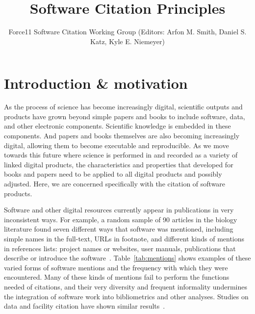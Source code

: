 \documentclass[11pt, oneside]{amsart}
\title{Software Citation Principles}
\author{Force11 Software Citation Working Group (Editors: Arfon M. Smith, Daniel S. Katz, Kyle E. Niemeyer)}
\date{}
\begin{document}
\begin{abstract}
\end{abstract}

\maketitle


\section{Introduction \& motivation}
\label{sec:intro}

As the process of science has become increasingly digital, scientific outputs and products have
grown beyond simple papers and books to include software, data, and other electronic
components.  Scientific knowledge is embedded in these components.  And papers and books
themselves are also becoming increasingly digital, allowing them to become executable
and reproducible.  As we move towards this future where science is performed in and recorded
as a variety of linked digital products, the characteristics and properties that developed for
books and papers need to be applied to all digital products and possibly adjusted.  Here, we are concerned specifically
with the citation of software products.

Software and other digital resources currently appear in publications in very inconsistent ways.
For example, a random sample of 90 articles in the biology literature
found seven different ways that software was mentioned, including simple
names in the full-text, URLs in footnote, and different kinds of mentions
in references lists: project names or websites, user manuals, publications
that describe or introduce the software~\cite{howison2015jasist}.
Table~\ref{tab:mentions} shows examples of these varied forms of software
mentions and the frequency with which they were encountered. 
Many of these kinds of mentions fail to perform the functions needed of citations, and their very diversity and frequent informality undermines the integration of software work into bibliometrics and other analyses. 
Studies on data and facility citation have shown similar results~\cite{parsons_duerr_minster, mayernik_poster}.
\end{document}
